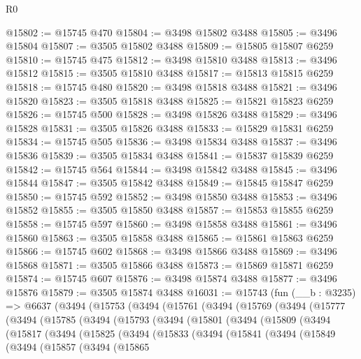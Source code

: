 \begin{lexlean}{R0}
\begin{coremodule}
@15802 := @15745 @470
@15804 := @3498 @15802 @3488
@15805 := @3496 @15804
@15807 := @3505 @15802 @3488
@15809 := @15805 @15807 @6259
@15810 := @15745 @475
@15812 := @3498 @15810 @3488
@15813 := @3496 @15812
@15815 := @3505 @15810 @3488
@15817 := @15813 @15815 @6259
@15818 := @15745 @480
@15820 := @3498 @15818 @3488
@15821 := @3496 @15820
@15823 := @3505 @15818 @3488
@15825 := @15821 @15823 @6259
@15826 := @15745 @500
@15828 := @3498 @15826 @3488
@15829 := @3496 @15828
@15831 := @3505 @15826 @3488
@15833 := @15829 @15831 @6259
@15834 := @15745 @505
@15836 := @3498 @15834 @3488
@15837 := @3496 @15836
@15839 := @3505 @15834 @3488
@15841 := @15837 @15839 @6259
@15842 := @15745 @564
@15844 := @3498 @15842 @3488
@15845 := @3496 @15844
@15847 := @3505 @15842 @3488
@15849 := @15845 @15847 @6259
@15850 := @15745 @592
@15852 := @3498 @15850 @3488
@15853 := @3496 @15852
@15855 := @3505 @15850 @3488
@15857 := @15853 @15855 @6259
@15858 := @15745 @597
@15860 := @3498 @15858 @3488
@15861 := @3496 @15860
@15863 := @3505 @15858 @3488
@15865 := @15861 @15863 @6259
@15866 := @15745 @602
@15868 := @3498 @15866 @3488
@15869 := @3496 @15868
@15871 := @3505 @15866 @3488
@15873 := @15869 @15871 @6259
@15874 := @15745 @607
@15876 := @3498 @15874 @3488
@15877 := @3496 @15876
@15879 := @3505 @15874 @3488
@16031 := @15743
    (fun (__b : @3235) =>
    @6637
      (@3494
        (@15753
          (@3494
            (@15761
              (@3494
                (@15769
                  (@3494
                    (@15777
                      (@3494
                        (@15785
                          (@3494
                            (@15793
                              (@3494
                                (@15801
                                  (@3494
                                    (@15809
                                      (@3494
                                        (@15817
                                          (@3494
                                            (@15825
                                              (@3494
                                                (@15833
                                                  (@3494
                                                    (@15841
                                                      (@3494
                                                        (@15849
                                                          (@3494
                                                            (@15857
                                                              (@3494
                                                                (@15865

\end{coremodule}
\end{lexlean}
